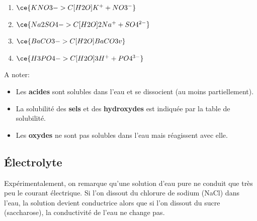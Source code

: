 \documentclass[
  11pt,
  a4paper,
  openany]{book}
\providecommand{\tightlist}{%
  \setlength{\itemsep}{0pt}\setlength{\parskip}{0pt}}
\begin{document}
\begin{Answer}

\begin{enumerate}
\def\labelenumi{\arabic{enumi}.}
\item
  \(\ce{KNO3 ->C[H2O] K^{+} + NO3^{-} }\)
\item
  \(\ce{Na2SO4 ->C[H2O] 2 Na^{+} + SO4^{2-} }\)
\item
  \(\ce{BaCO3 ->C[H2O] BaCO3 v }\)
\item
  \(\ce{H3PO4 ->C[H2O] 3 H^{+} + PO4^{3-} }\)
\end{enumerate}

\end{Answer}

A noter:

\begin{itemize}
\tightlist
\item
  Les \textbf{acides} sont solubles dans l'eau et se dissocient (au moins partiellement).
\item
  La solubilité des \textbf{sels} et des \textbf{hydroxydes} est indiquée par la table de solubilité.
\item
  Les \textbf{oxydes} ne sont pas solubles dans l'eau mais réagissent avec elle.
\end{itemize}

\newpage

\hypertarget{uxe9lectrolyte}{%
\subsection{Électrolyte}\label{uxe9lectrolyte}}

Expérimentalement, on remarque qu'une solution d'eau pure ne conduit que très peu le courant électrique. Si l'on dissout du chlorure de sodium (NaCl) dans l'eau, la solution devient conductrice alors que si l'on dissout du sucre (saccharose), la conductivité de l'eau ne change pas.
\end{document}
